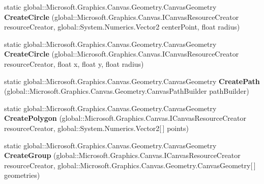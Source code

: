\begin{DoxyCompactItemize}
static global\+::\+Microsoft.\+Graphics.\+Canvas.\+Geometry.\+Canvas\+Geometry {\bfseries Create\+Circle} (global\+::\+Microsoft.\+Graphics.\+Canvas.\+I\+Canvas\+Resource\+Creator resource\+Creator, global\+::\+System.\+Numerics.\+Vector2 center\+Point, float radius)
\item 
\mbox{\label{class_microsoft_1_1_graphics_1_1_canvas_1_1_geometry_1_1_canvas_geometry_aa92a58291260e1f96f156e7d47e03c3d}} 
static global\+::\+Microsoft.\+Graphics.\+Canvas.\+Geometry.\+Canvas\+Geometry {\bfseries Create\+Circle} (global\+::\+Microsoft.\+Graphics.\+Canvas.\+I\+Canvas\+Resource\+Creator resource\+Creator, float x, float y, float radius)
\item 
\mbox{\label{class_microsoft_1_1_graphics_1_1_canvas_1_1_geometry_1_1_canvas_geometry_a7a89ba595e7afee0fe55e1dd7c7c4315}} 
static global\+::\+Microsoft.\+Graphics.\+Canvas.\+Geometry.\+Canvas\+Geometry {\bfseries Create\+Path} (global\+::\+Microsoft.\+Graphics.\+Canvas.\+Geometry.\+Canvas\+Path\+Builder path\+Builder)
\item 
\mbox{\label{class_microsoft_1_1_graphics_1_1_canvas_1_1_geometry_1_1_canvas_geometry_a1f5119d034d404cb9dc30ac067fcc1d1}} 
static global\+::\+Microsoft.\+Graphics.\+Canvas.\+Geometry.\+Canvas\+Geometry {\bfseries Create\+Polygon} (global\+::\+Microsoft.\+Graphics.\+Canvas.\+I\+Canvas\+Resource\+Creator resource\+Creator, global\+::\+System.\+Numerics.\+Vector2\mbox{[}$\,$\mbox{]} points)
\item 
\mbox{\label{class_microsoft_1_1_graphics_1_1_canvas_1_1_geometry_1_1_canvas_geometry_a9905813ee5fbbed32289fa93a3ecaed8}} 
static global\+::\+Microsoft.\+Graphics.\+Canvas.\+Geometry.\+Canvas\+Geometry {\bfseries Create\+Group} (global\+::\+Microsoft.\+Graphics.\+Canvas.\+I\+Canvas\+Resource\+Creator resource\+Creator, global\+::\+Microsoft.\+Graphics.\+Canvas.\+Geometry.\+Canvas\+Geometry\mbox{[}$\,$\mbox{]} geometries)
\item 
\mbox{\label{class_microsoft_1_1_graphics_1_1_canvas_1_1_geometry_1_1_canvas_geometry_a1af065a42d2349de0898d7f63c2af94a}} 

\end{DoxyCompactItemize}
